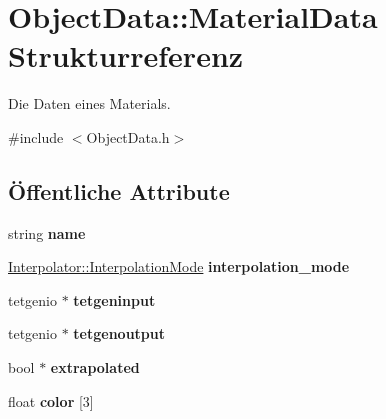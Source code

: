 \hypertarget{structObjectData_1_1MaterialData}{\section{Object\-Data\-:\-:Material\-Data Strukturreferenz}
\label{structObjectData_1_1MaterialData}
}


Die Daten eines Materials.  




{\ttfamily \#include $<$Object\-Data.\-h$>$}

\subsection*{Öffentliche Attribute}
\begin{DoxyCompactItemize}
\item 
\hypertarget{structObjectData_1_1MaterialData_a795f1265218b9a125559bbe9231f3c8d}{string {\bfseries name}}\label{structObjectData_1_1MaterialData_a795f1265218b9a125559bbe9231f3c8d}

\item 
\hypertarget{structObjectData_1_1MaterialData_a35d4f03b3af4349f69d5fed072118dca}{\hyperlink{classInterpolator_adb733b1439a2903feae57fa734ced0c2}{Interpolator\-::\-Interpolation\-Mode} {\bfseries interpolation\-\_\-mode}}\label{structObjectData_1_1MaterialData_a35d4f03b3af4349f69d5fed072118dca}

\item 
\hypertarget{structObjectData_1_1MaterialData_ab752395b4aedbe011fa49de7fbbd36ee}{tetgenio $\ast$ {\bfseries tetgeninput}}\label{structObjectData_1_1MaterialData_ab752395b4aedbe011fa49de7fbbd36ee}

\item 
\hypertarget{structObjectData_1_1MaterialData_a15d576cfe25abe334e34eb5e4671d6d7}{tetgenio $\ast$ {\bfseries tetgenoutput}}\label{structObjectData_1_1MaterialData_a15d576cfe25abe334e34eb5e4671d6d7}

\item 
\hypertarget{structObjectData_1_1MaterialData_a22bff8a90f617a5485690bd017dcf701}{bool $\ast$ {\bfseries extrapolated}}\label{structObjectData_1_1MaterialData_a22bff8a90f617a5485690bd017dcf701}

\item 
\hypertarget{structObjectData_1_1MaterialData_a3930f8e673d50b88c9234c7f73c16a91}{float {\bfseries color} \mbox{[}3\mbox{]}}\label{structObjectData_1_1MaterialData_a3930f8e673d50b88c9234c7f73c16a91}


\end{DoxyCompactItemize}
